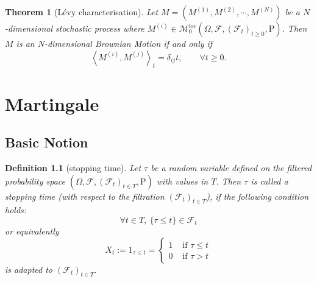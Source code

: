 \documentclass{report}
\newtheorem{definition}{Definition}[section]
\newtheorem{theorem}{Theorem}[section]
\theoremstyle{nonumberplain}
\begin{document}
\begin{theorem}[Lévy characterisation]
	Let $M=\left(M^{(1)}, M^{(2)}, \cdots, M^{(N)}\right)$ be a $N$-dimensional stochastic process where $M^{(i)}\in\mathscr{M}_0^{\mathrm{loc}}(\Omega,\mathcal{F},(\mathcal{F}_{t})_{t\ge0},\mathrm{P})$. Then $M$ is an $N$-dimensional Brownian Motion if and only if 
	\[
	\left\langle M^{(i)},M^{(j)}\right\rangle_t=\delta_{ij}t,\qquad\forall t\ge0.
	\]
\end{theorem}

\chapter{Martingale}
\section{Basic Notion}



\begin{definition}[stopping time]
Let $\tau$  be a random variable defined on the filtered probability space $(\Omega,\mathcal{F},(\mathcal{F}_{t})_{t\in T },\mathrm{P})$ with values in $T$. Then $\tau$  is called a \emph{stopping time} (with respect to the filtration $(\mathcal{F}_{t})_{t\in T}$), if the following condition holds:
\[
\forall t\in T,\ \{\tau \leq t\}\in {\mathcal {F}}_{t}
\]
or equivalently
\[
X_{t} :=1_{\tau\le t}=\left\{\begin{array}{ll}{1} & {\text { if }  \tau\le t } \\ {0} & {\text { if }\tau >t}\end{array}\right.
\]
is adapted to $(\mathcal{F}_{t})_{t\in T }$.
\end{definition}
\end{document}
